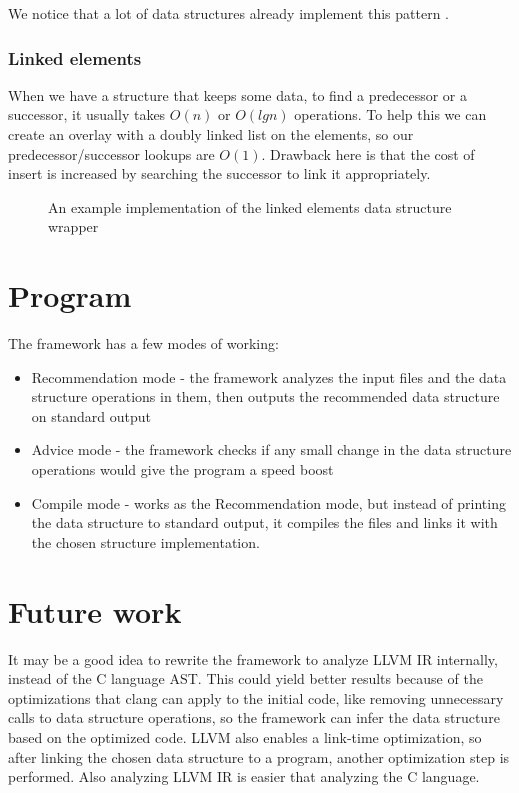 \documentclass[a4paper,11pt]{article}
\begin{document}
			We notice that a lot of data structures already implement this pattern .

		\subsubsection{Linked elements}

			When we have a structure that keeps some data, to find a predecessor or a successor, it usually
			takes $O(n)$ or $O(lg n)$ operations.  To help this we can create an overlay with a doubly
			linked list on the elements, so our predecessor/successor lookups are $O(1)$. Drawback here is
			that the cost of insert is increased by searching the successor to link it appropriately.

			\begin{figure}
				

				\caption{An example implementation of the linked elements data structure wrapper}

				\label{fig:linked-cache}
			\end{figure}

\section{Program}

	The framework has a few modes of working:
	\begin{itemize}
		\item Recommendation mode - the framework analyzes the input files and the data structure operations in
			them, then outputs the recommended data structure on standard output
		\item Advice mode - the framework checks if any small change in the data structure operations would give
			the program a speed boost
		\item Compile mode - works as the Recommendation mode, but instead of printing the data structure to
			standard output, it compiles the files and links it with the chosen structure implementation.
	\end{itemize}

\section{Future work} \label{sec:future}
	It may be a good idea to rewrite the framework to analyze LLVM\cite{LLVM} IR internally, instead of the C
	language AST.  This could yield better results because of the optimizations that clang\cite{Clang} can apply to
	the initial code, like removing unnecessary calls to data structure operations, so the framework can infer the
	data structure based on the optimized code. LLVM also enables a link-time optimization, so after linking the
	chosen data structure to a program, another optimization step is performed. Also analyzing LLVM IR is easier
	that analyzing the C language.
\end{document}
